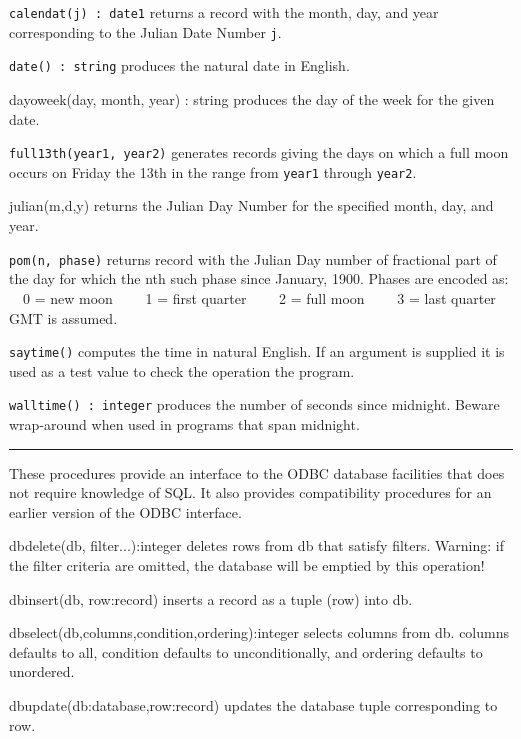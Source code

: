 \texttt{calendat(j) : date1} returns a record with the month, day, and
year corresponding to the Julian Date Number \texttt{j}.

\texttt{date() : string} produces the natural date in English.

\textsf{dayoweek(day, month, year) : string} produces the day of the
week for the given date.

\texttt{full13th(year1, year2)} generates records giving the days on
which a full moon occurs on Friday the 13th in the range from
\texttt{year1} through \texttt{year2}.

\textsf{julian(m,d,y)} returns the Julian Day Number for the specified
month, day, and year.

\texttt{pom(n, phase)} returns record with the Julian Day number of
fractional part of the day for which the nth such phase since January,
1900. Phases are encoded as:\\
\ \ 0 = new moon \ \ \ \ 1 = first quarter \ \ \ \ 2 = full moon
\ \ \ \ 3 = last quarter\\
GMT is assumed.

\texttt{saytime()} computes the time in natural English. If an argument
is supplied it is used as a test value to check the operation the
program.

\texttt{walltime() : integer} produces the number of seconds since
midnight. Beware wrap-around when used in programs that span midnight.

\vspace{0.25cm}\hrule{}

These procedures provide an interface to the ODBC database facilities
that does not require knowledge of SQL. It also provides compatibility
procedures for an earlier version of the ODBC interface.

dbdelete(db, filter...):integer deletes rows from db that satisfy
filters. Warning: if the filter criteria are omitted, the
database will be emptied by this operation!

dbinsert(db, row:record) inserts a record as a tuple (row) into db.

dbselect(db,columns,condition,ordering):integer selects columns from db.
columns defaults to {\textquotedbl}all{\textquotedbl}, condition
defaults to unconditionally, and ordering defaults to unordered.

\textsf{dbupdate(db:database,row:record)} updates the database tuple
corresponding to row.

